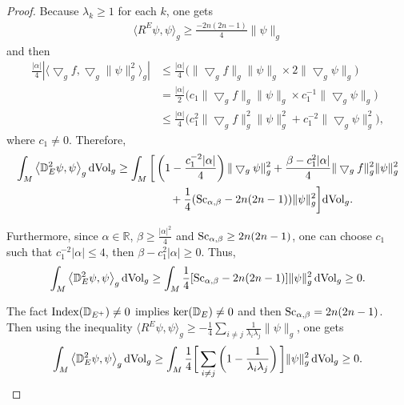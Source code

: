\documentclass[10pt,a4paper]{amsart}
\begin{document}
\begin{proof}
Because $\lambda_k\geq 1$ for each $k$, one gets
\begin{gather*}
 \big\langle R^E\psi, \psi\big\rangle_g \geq \frac{-2n(2n-1)}{4}\|\psi\|_g
 \end{gather*}
 and then
\begin{align*}
\frac{|\alpha|}{4}|\big\langle\bigtriangledown_gf, \bigtriangledown_g \|\psi\|^2_g \big\rangle_g| &\leq \frac{|\alpha|}{4}\big(\|\bigtriangledown_gf\|_g \|\psi\|_g \times 2 \|\bigtriangledown_g \psi\|_g\big)\\
& = \frac{|\alpha|}{2}\big( c_1 \|\bigtriangledown_gf\|_g\|\psi\|_g \times c_1^{-1} \|\bigtriangledown_g\psi\|_g\big) \\
& \leq \frac{|\alpha|}{4} \big(c_1^2 \|\bigtriangledown_gf\|^2_g \|\psi\|^2_g + c_1^{-2} \|\bigtriangledown_g\psi\|^2_g\big),
 \end{align*}
where $c_1 \neq 0$. Therefore,
\begin{gather*}
\int_M \big\langle \mathbb{D}^2_E \psi, \psi \big\rangle_g \,{\rm dVol}_g \geq
 \int_M \bigg[\left(1- \frac{c_1^{-2} |\alpha|}{4}\right)\|\bigtriangledown_g\psi\|^2_g + \frac{\beta - c_1^{2} |\alpha|}{4} \|\bigtriangledown_gf\|^2_g\|\psi\|^2_g \\
\hphantom{\int_M \langle \mathbb{D}^2_E \psi, \psi \rangle_g \,{\rm dVol}_g \geq}{}
 +\frac{1}{4} ({\rm Sc}_{\alpha, \beta}-2n(2n-1)) \|\psi\|^2_g \bigg] {\rm dVol}_g.
\end{gather*}

Furthermore, since $\alpha \in \mathbb{R}$, $\beta \geq \frac{|\alpha|^2}{4}$ and ${\rm Sc}_{\alpha, \beta}\geq 2n(2n-1)$, one can choose $c_1$ such that $c_1^{-2} |\alpha|\leq 4$, then $\beta - c_1^{2} |\alpha|\geq 0$. Thus,
\begin{equation*}
\int_M \big\langle \mathbb{D}^2_E \psi, \psi \big\rangle_g \,{\rm dVol}_g\geq \int_M \frac{1}{4} [{\rm Sc}_{\alpha, \beta}-2n(2n-1)]\|\psi\|^2_g \,{\rm dVol}_g\geq 0.
\end{equation*}

The fact ${\rm Index}(\mathbb{D}_{E^+})\neq 0$ implies ${\rm ker}(\mathbb{D}_E)\neq 0$ and then ${\rm Sc}_{\alpha, \beta}=2n(2n-1)$. Then using the inequality $\big\langle R^E\psi, \psi\big\rangle_g \geq -\frac{1}{4}\sum_{i\neq j}\frac{1}{\lambda_i\lambda_j}\|\psi\|_g$, one gets
\begin{equation*}
\int_M \big\langle \mathbb{D}^2_E \psi, \psi \big\rangle_g \,{\rm dVol}_g\geq \int_M \frac{1}{4} \bigg[\sum_{i\neq j}\left(1-\frac{1}{\lambda_i\lambda_j}\right)\bigg]\|\psi\|^2_g \,{\rm dVol}_g\geq 0.
\end{equation*}


\end{proof}
\end{document}
